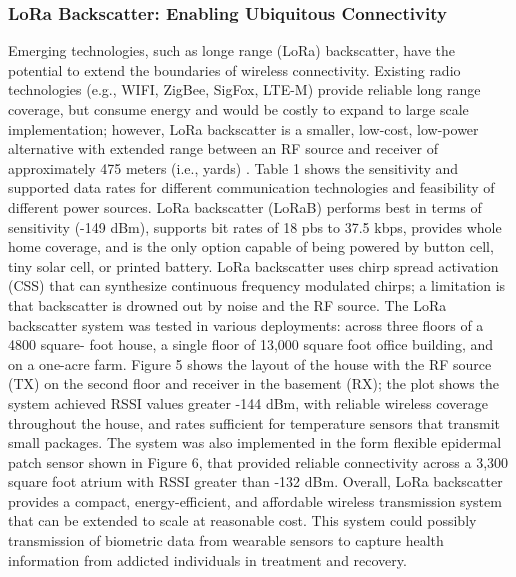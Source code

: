 \documentclass[sigconf]{acmart}
\begin{document}
\subsubsection{LoRa Backscatter: Enabling Ubiquitous Connectivity} 

Emerging technologies, such as longe range (LoRa) backscatter, have the potential 
to extend the boundaries of wireless connectivity. Existing radio technologies 
(e.g., WIFI, ZigBee, SigFox, LTE-M) provide reliable long range coverage, but 
consume energy and would be costly to expand to large scale implementation; 
however, LoRa backscatter is a smaller, low-cost, low-power alternative with 
extended range between an RF source and receiver of approximately 475 meters 
(i.e., yards) \cite{talla17}. Table 1 shows the sensitivity and supported data 
rates for different communication technologies and  feasibility of different 
power sources. LoRa backscatter (LoRaB) performs best in terms of sensitivity 
(-149 dBm), supports bit rates of 18 pbs to 37.5 kbps, provides whole home 
coverage, and is the only option capable of being powered by button cell, tiny 
solar cell, or printed battery. LoRa backscatter uses chirp spread activation 
(CSS) that can synthesize continuous frequency modulated chirps; a limitation is 
that backscatter is drowned out by noise and the RF source. The LoRa backscatter 
system was tested in various deployments: across three floors of a 4800 square-
foot house, a single floor of 13,000 square foot office building, and on a 
one-acre farm. Figure 5 shows the layout of the house with the RF source (TX) 
on the second floor and receiver in the basement (RX); the plot shows the system 
achieved RSSI values greater -144 dBm, with reliable wireless coverage throughout 
the house, and rates sufficient for temperature sensors that transmit small 
packages. The system was also implemented in the form flexible epidermal patch 
sensor shown in Figure 6, that provided reliable connectivity across a 3,300 
square foot atrium with RSSI greater than -132 dBm. Overall, LoRa backscatter 
provides a compact, energy-efficient, and affordable wireless transmission 
system that can be extended to scale at reasonable cost. This system could
possibly transmission of biometric data from wearable sensors to capture 
health information from addicted individuals in treatment and recovery. 
\end{document}
